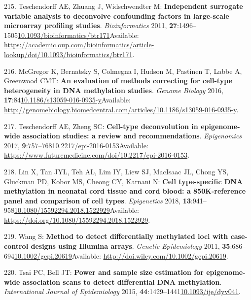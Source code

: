\documentclass[
]{book}
\begin{document}
\leavevmode\hypertarget{ref-Teschendorff2011}{}%
215. Teschendorff AE, Zhuang J, Widschwendter M: \textbf{Independent surrogate variable analysis to deconvolve confounding factors in large-scale microarray profiling studies}. \emph{Bioinformatics} 2011, \textbf{27}:1496--1505\href{https://doi.org/10.1093/bioinformatics/btr171}{10.1093/bioinformatics/btr171}Available: \url{https://academic.oup.com/bioinformatics/article-lookup/doi/10.1093/bioinformatics/btr171}.

\leavevmode\hypertarget{ref-McGregor2016}{}%
216. McGregor K, Bernatsky S, Colmegna I, Hudson M, Pastinen T, Labbe A, Greenwood CMT: \textbf{An evaluation of methods correcting for cell-type heterogeneity in DNA methylation studies}. \emph{Genome Biology} 2016, \textbf{17}:84\href{https://doi.org/10.1186/s13059-016-0935-y}{10.1186/s13059-016-0935-y}Available: \url{http://genomebiology.biomedcentral.com/articles/10.1186/s13059-016-0935-y}.

\leavevmode\hypertarget{ref-Teschendorff2017}{}%
217. Teschendorff AE, Zheng SC: \textbf{Cell-type deconvolution in epigenome-wide association studies: a review and recommendations}. \emph{Epigenomics} 2017, \textbf{9}:757--768\href{https://doi.org/10.2217/epi-2016-0153}{10.2217/epi-2016-0153}Available: \url{https://www.futuremedicine.com/doi/10.2217/epi-2016-0153}.

\leavevmode\hypertarget{ref-Lin2018}{}%
218. Lin X, Tan JYL, Teh AL, Lim IY, Liew SJ, MacIsaac JL, Chong YS, Gluckman PD, Kobor MS, Cheong CY, Karnani N: \textbf{Cell type-specific DNA methylation in neonatal cord tissue and cord blood: a 850K-reference panel and comparison of cell types}. \emph{Epigenetics} 2018, \textbf{13}:941--958\href{https://doi.org/10.1080/15592294.2018.1522929}{10.1080/15592294.2018.1522929}Available: \url{https://doi.org/10.1080/15592294.2018.1522929}.

\leavevmode\hypertarget{ref-Wang2011}{}%
219. Wang S: \textbf{Method to detect differentially methylated loci with case-control designs using Illumina arrays}. \emph{Genetic Epidemiology} 2011, \textbf{35}:686--694\href{https://doi.org/10.1002/gepi.20619}{10.1002/gepi.20619}Available: \url{http://doi.wiley.com/10.1002/gepi.20619}.

\leavevmode\hypertarget{ref-Tsai2015}{}%
220. Tsai PC, Bell JT: \textbf{Power and sample size estimation for epigenome-wide association scans to detect differential DNA methylation}. \emph{International Journal of Epidemiology} 2015, \textbf{44}:1429--1441\href{https://doi.org/10.1093/ije/dyv041}{10.1093/ije/dyv041}.
\end{document}
